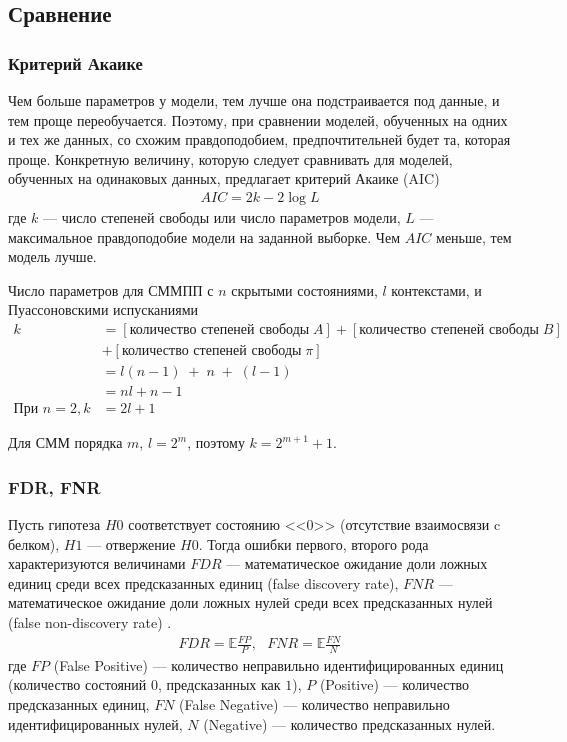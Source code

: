 \documentclass{matmex-diploma-custom}
\begin{document}
\subsection{Сравнение}
\subsubsection*{Критерий Акаике}
Чем больше параметров у модели, тем лучше она подстраивается под данные, и тем проще переобучается. 
Поэтому, при сравнении моделей, обученных на одних и тех же данных, со схожим правдоподобием, предпочтительней будет та, которая проще. 
Конкретную величину, которую следует сравнивать для моделей, обученных на одинаковых данных, предлагает критерий Акаике (AIC)
\begin{align}
AIC = 2k-2\log{L}
\end{align}
где $ k $ --- число степеней свободы или число параметров модели, $ L $ --- максимальное правдоподобие модели на заданной выборке. Чем $AIC$ меньше, тем модель лучше. 

Число параметров для СММПП с $ n $ скрытыми состояниями, $ l $ контекстами, и Пуассоновскими испусканиями 
\begin{align}
k &= [\text{количество степеней свободы} \; A ] \nonumber
+ [\text{количество степеней свободы} \; B ] \nonumber
\\&+ [\text{количество степеней свободы} \; \pi ] \nonumber
\\ &= l(n-1)\;+\;n\;+\;(l-1) \nonumber\\&= nl + n - 1
\\ 
\text{При } n=2, k &= 2l + 1 \nonumber
\end{align}

Для СММ порядка $m$, $l=2^m$, поэтому $k = 2^{m+1}+1$.

\subsubsection*{FDR, FNR} 
Пусть гипотеза $\textit{H0}$ соответствует состоянию <<$0$>> (отсутствие взаимосвязи c белком), $\textit{H1}$ --- отвержение $\textit{H0}$.
Тогда ошибки первого, второго рода характеризуются величинами $\textit{FDR}$ --- математическое ожидание доли ложных единиц среди всех предсказанных единиц (false discovery rate),
$\textit{FNR}$ --- математическое ожидание доли ложных нулей среди всех предсказанных нулей  (false non-discovery rate) \cite{Sun2009}.
\begin{align}
\textit{FDR} = \mathbb{E}\frac{\textit{FP}}{\textit{P}}, 
~~~\textit{FNR} = \mathbb{E}\frac{\textit{FN}}{\textit{N}}
\end{align}
где $\textit{FP}$ (False Positive) --- количество неправильно идентифицированных единиц (количество состояний $0$, предсказанных как $1$), $\textit{P}$ (Positive) --- количество предсказанных единиц, $\textit{FN}$ (False Negative) --- количество неправильно идентифицированных нулей, $\textit{N}$ (Negative) --- количество предсказанных нулей. 
\end{document}
